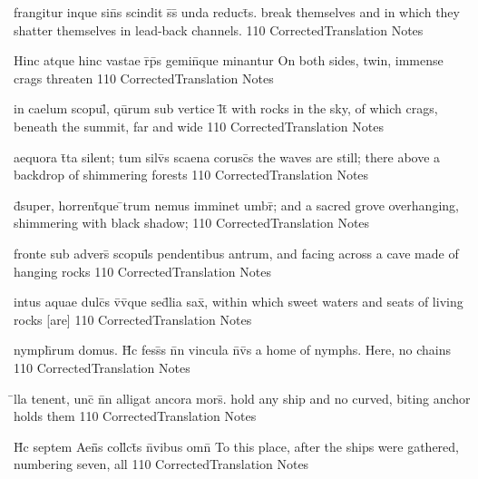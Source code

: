 \latline
  {frangitur inque sin\={}s scindit s\={}s\={} unda reduct\={}s.}
  { break themselves and in which they shatter themselves in lead-back channels. }
  {110}
  { CorrectedTranslation }
  { Notes }


\latline
  {Hinc atque hinc vastae r\={}p\={}s gemin\={\macron {\i}}que minantur}
  { On both sides, twin, immense crags threaten }
  {110}
  { CorrectedTranslation }
  { Notes }



\latline
  {in caelum scopul\={\macron {\i}}, qu\={}rum sub vertice l\={}t\={}}
  { with rocks in the sky, of which crags, beneath the summit, far and wide }
  {110}
  { CorrectedTranslation }
  { Notes }


\latline
  {aequora t\={}ta silent; tum silv\={\macron {\i}}s scaena corusc\={\macron {\i}}s}
  { the waves are still; there above a backdrop of shimmering forests }
  {110}
  { CorrectedTranslation }
  { Notes }


\latline
  {d\={}super, horrent\={\macron {\i}}que \={}trum nemus imminet umbr\={};}
  { and a sacred grove overhanging, shimmering with black shadow; }
  {110}
  { CorrectedTranslation }
  { Notes }



\latline
  {fronte sub advers\={} scopul\={\macron {\i}}s pendentibus antrum,}
  { and facing across a cave made of hanging rocks }
  {110}
  { CorrectedTranslation }
  { Notes }


\latline
  {intus aquae dulc\={}s v\={\macron {\i}}v\={}que sed\={\macron {\i}}lia sax\={},}
  { within which sweet waters and seats of living rocks [are] }
  {110}
  { CorrectedTranslation }
  { Notes }


\latline
  {nymph\={}rum domus.  H\={\macron {\i}}c fess\={}s n\={}n vincula n\={}v\={\macron {\i}}s}
  { a home of nymphs.  Here, no chains  }
  {110}
  { CorrectedTranslation }
  { Notes }



\latline
  {\={}lla tenent, unc\={} n\={}n alligat ancora mors\={}.}
  { hold any ship and no curved, biting anchor holds them }
  {110}
  { CorrectedTranslation }
  { Notes }


\latline
  {H\={}c septem Aen\={}\={}s coll\={}ct\={\macron {\i}}s n\={}vibus omn\={\macron {\i}}}
  { To this place, after the ships were gathered, numbering seven, all  }
  {110}
  { CorrectedTranslation }
  { Notes }


